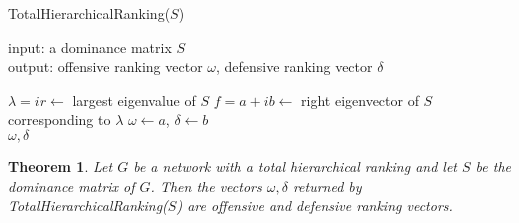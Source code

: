\documentclass[a4,11pt,twoside,leqno]{report}
\newtheorem{thm}{Theorem}[section]
\theoremstyle{definition}
\theoremstyle{remark}
\numberwithin{equation}{section}
\begin{document}
\begin{algorithm}[H]
\caption{TotalHierarchicalRanking($S$)}
\label{alg:thr}
input: a dominance matrix $S$\\
output: offensive ranking vector $\omega$, defensive ranking vector $\delta$\\
\begin{algorithmic}
  \State $\lambda=ir \gets$ largest eigenvalue of $S$
  \State $f=a+ib \gets$ right eigenvector of $S$ corresponding to $\lambda$
  \State $\omega \gets a$, $\delta \gets b$\\
  \Return $\omega, \delta$
\end{algorithmic} 
\end{algorithm}

\begin{thm}\label{thm:thr}
Let $G$ be a network with a total hierarchical ranking and let $S$ be the
dominance matrix of $G$.  Then the vectors $\omega, \delta$ returned by
TotalHierarchicalRanking($S$) are offensive and defensive ranking vectors.
\end{thm}
\end{document}
